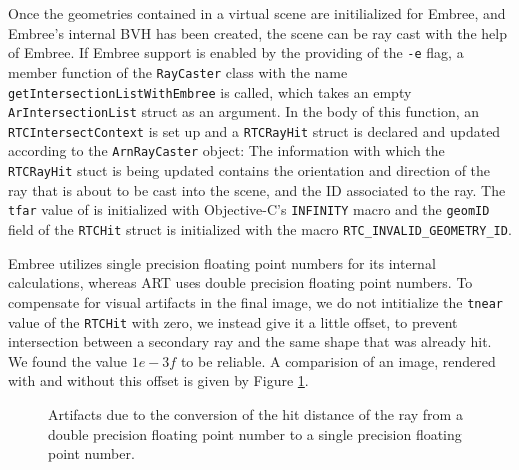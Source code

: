 Once the geometries contained in a virtual scene are initilialized for Embree, and Embree's internal BVH has been created, the scene can be ray cast with the help of Embree. If Embree support is enabled by the providing of the \texttt{-e} flag, a member function of the \texttt{RayCaster} class with the name \texttt{getIntersectionListWithEmbree} is called, which takes an empty \texttt{ArIntersectionList} struct  as an argument. In the body of this function, an \texttt{RTCIntersectContext} is set up and a \texttt{RTCRayHit} struct is declared and updated according to the \texttt{ArnRayCaster} object: The information with which the  \texttt{RTCRayHit} stuct is being updated contains the orientation and direction of the ray that is about to be cast into the scene, and the ID associated to the ray. The \texttt{tfar} value of is initialized with Objective-C's \texttt{INFINITY} macro and the \texttt{geomID} field of the \texttt{RTCHit} struct is initialized with the macro \texttt{RTC\_INVALID\_GEOMETRY\_ID}. 

Embree utilizes single precision floating point numbers for its internal calculations, whereas ART uses double precision floating point numbers. To compensate for visual artifacts in the final image, we do not intitialize the \texttt{tnear} value of the \texttt{RTCHit} with zero, we instead give it a little offset, to prevent intersection between a secondary ray and the same shape that was already hit. We found the value $1e-3f$ to be reliable. A comparision of an image, rendered with and without this offset is given by Figure \ref{fig:offset}.

\begin{figure}[!tbp]
	\centering
	\hfill
	\caption{Artifacts due to the conversion of the hit distance of the ray from a double precision floating point number to a single precision floating point number.}
	\label{fig:offset}
\end{figure}

